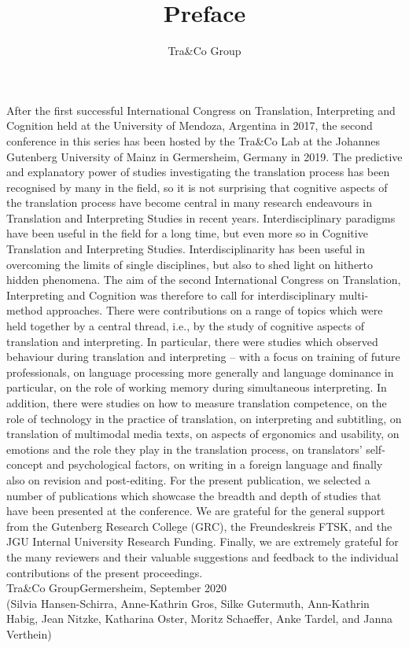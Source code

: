 \documentclass[output=paper]{langsci/langscibook}
\title{Preface}
\author{{Tra\&Co Group}\affiliation{Johannes Gutenberg University Mainz}}
\begin{document}
\maketitle

\noindent After the first successful International Congress on Translation, Interpreting and Cognition held at the University of Mendoza, Argentina in 2017, the second conference in this series has been hosted by the Tra\&Co Lab at the Johannes Gutenberg University of Mainz in Germersheim, Germany in 2019. The predictive and explanatory power of studies investigating the translation process has been recognised by many in the field, so it is not surprising that cognitive aspects of the translation process have become central in many research endeavours in Translation and Interpreting Studies in recent years. Interdisciplinary paradigms have been useful in the field for a long time, but even more so in Cognitive Translation and Interpreting Studies. Interdisciplinarity has been useful in overcoming the limits of single disciplines, but also to shed light on hitherto hidden phenomena. The aim of the second International Congress on Translation, Interpreting and Cognition was therefore to call for interdisciplinary multi-method approaches. There were contributions on a range of topics which were held together by a central thread, i.e., by the study of cognitive aspects of translation and interpreting. In particular, there were studies which observed behaviour during translation and interpreting – with a focus on training of future professionals, on language processing more generally and language dominance in particular, on the role of working memory during simultaneous interpreting. In addition, there were studies on how to measure translation competence, on the role of technology in the practice of translation, on interpreting and subtitling, on translation of multimodal media texts, on aspects of ergonomics and usability, on emotions and the role they play in the translation process, on translators' self-concept and psychological factors, on writing in a foreign language and finally also on revision and post-editing. For the present publication, we selected a number of publications which showcase the breadth and depth of studies that have been presented at the conference. We are grateful for the general support from the Gutenberg Research College (GRC), the Freundeskreis FTSK, and the JGU Internal University Research Funding. Finally, we are extremely grateful for the many reviewers and their valuable suggestions and feedback to the individual contributions of the present proceedings.\bigskip\\

\noindent Tra\&Co Group\hfill Germersheim, September 2020\\
\noindent
(Silvia Hansen-Schirra, Anne-Kathrin Gros, Silke Gutermuth, Ann-Kathrin Habig, Jean Nitzke, Katharina Oster, Moritz Schaeffer, Anke Tardel, and Janna Verthein)
\end{document}
